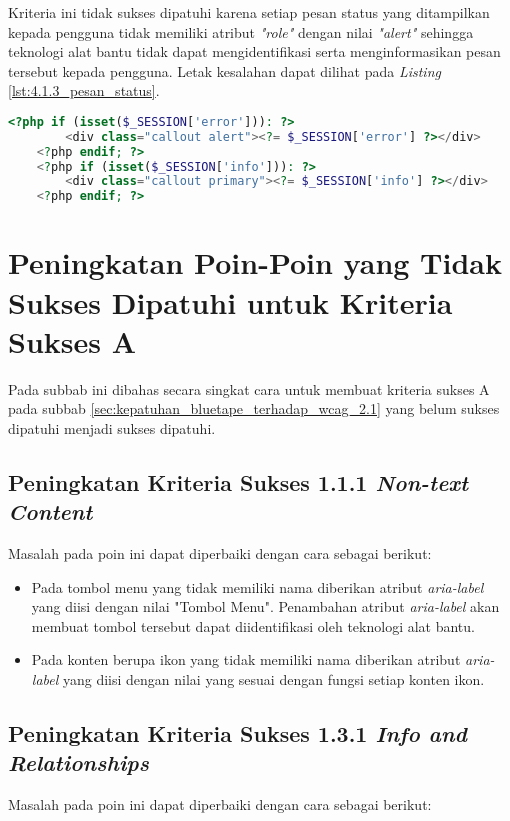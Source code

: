 Kriteria ini tidak sukses dipatuhi karena setiap pesan status yang ditampilkan kepada pengguna tidak memiliki atribut \textit{"role"} dengan nilai \textit{"alert"} sehingga teknologi alat bantu tidak dapat mengidentifikasi serta menginformasikan pesan tersebut kepada pengguna. Letak kesalahan dapat dilihat pada \textit{Listing} \ref{lst:4.1.3_pesan_status}.

\begin{lstlisting}[frame=single, label={lst:4.1.3_pesan_status}, language=PHP, caption=Pelanggaran Kriteria Sukses 4.1.3 pada Bagian Pesan Status]
    <?php if (isset($_SESSION['error'])): ?>
        <div class="callout alert"><?= $_SESSION['error'] ?></div>
    <?php endif; ?>
    <?php if (isset($_SESSION['info'])): ?>
        <div class="callout primary"><?= $_SESSION['info'] ?></div>
    <?php endif; ?>
\end{lstlisting}

\section{Peningkatan Poin-Poin yang Tidak Sukses Dipatuhi untuk Kriteria Sukses A}
\label{sec:peningkatan_kriteria_sukses_a}
Pada subbab ini dibahas secara singkat cara untuk membuat kriteria sukses A pada subbab \ref{sec:kepatuhan_bluetape_terhadap_wcag_2.1} yang belum sukses dipatuhi menjadi sukses dipatuhi.

\subsection{Peningkatan Kriteria Sukses 1.1.1 \textit{Non-text Content}}
\label{subsec:peningkatan_kriteria_sukses_1.1.1}
Masalah pada poin ini dapat diperbaiki dengan cara sebagai berikut: 

\begin{itemize}
    \item Pada tombol menu yang tidak memiliki nama diberikan atribut \textit{aria-label} yang diisi dengan nilai "Tombol Menu". Penambahan atribut \textit{aria-label} akan membuat tombol tersebut dapat diidentifikasi oleh teknologi alat bantu.
    \item Pada konten berupa ikon yang tidak memiliki nama diberikan atribut \textit{aria-label} yang diisi dengan nilai yang sesuai dengan fungsi setiap konten ikon.
\end{itemize}

\subsection{Peningkatan Kriteria Sukses 1.3.1 \textit{Info and Relationships}}
\label{subsec:peningkatan_kriteria_sukses_1.3.1}
Masalah pada poin ini dapat diperbaiki dengan cara sebagai berikut:

